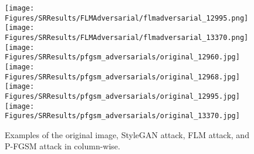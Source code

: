 \documentclass[sn-mathphys]{sn-jnl}%
\theoremstyle{thmstyleone}%
\theoremstyle{thmstyletwo}%
\theoremstyle{thmstylethree}%
\begin{document}
\begin{figure}[t!]
\texttt{[image: Figures/SRResults/FLMAdversarial/flmadversarial\_12995.png]}
\texttt{[image: Figures/SRResults/FLMAdversarial/flmadversarial\_13370.png]}\\
\texttt{[image: Figures/SRResults/pfgsm\_adversarials/original\_12960.jpg]}
\texttt{[image: Figures/SRResults/pfgsm\_adversarials/original\_12968.jpg]}
\texttt{[image: Figures/SRResults/pfgsm\_adversarials/original\_12995.jpg]}
\texttt{[image: Figures/SRResults/pfgsm\_adversarials/original\_13370.jpg]}

\caption{Examples of the original image, StyleGAN attack, FLM attack, and P-FGSM attack in column-wise.}
\label{pFGSMresults}
\end{figure}
\end{document}
